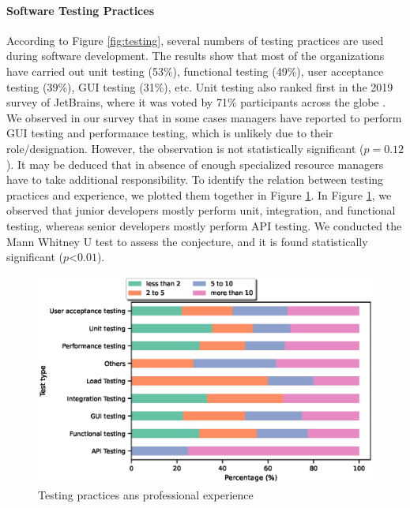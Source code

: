 \paragraph{Software Testing Practices}
According to Figure \ref{fig:testing}, several numbers of testing practices are used during software development. The results show that most of the organizations have carried out unit testing (53\%), functional testing (49\%), user acceptance testing (39\%), GUI testing (31\%), etc. Unit testing also ranked first in the 2019 survey of JetBrains, where it was voted by 71\% participants across the globe \cite{JetBrains2019}. We observed in our survey that in some cases managers have reported to perform GUI testing and performance testing, which is unlikely due to their role/designation. However, the observation is not statistically significant ($p=0.12$). It may be deduced that in absence of enough specialized resource managers have to take additional responsibility. To identify the relation between testing practices and experience, we plotted them together in Figure \ref{fig:testing type and experience}. In Figure \ref{fig:testing type and experience}, we observed that junior developers mostly perform unit, integration, and functional testing, whereas senior developers mostly perform API testing. We conducted the Mann Whitney U test to assess the conjecture, and it is found statistically significant ($p$<$0.01$).
\begin{figure}[h]
\centering
  \includegraphics[scale=0.6]{Figures/Testing_Type_and_Experience}
  \caption{Testing practices ans professional experience}
  \label{fig:testing type and experience}
\end{figure}

